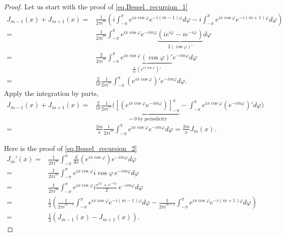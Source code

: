 \begin{proof} Let us start with the proof of \eqref{eq.Bessel_recursion_1}
\begin{equation}\label{eq.proof_Bessel_recursion_1}
\begin{split}
    J_{m-1}(x) + J_{m+1}(x) =& \frac{1}{2\pi i^m} \left(i\int_{-\pi}^{\pi} e^{ix \cos \varphi} e^{-i(m-1) \varphi} d\varphi - i\int_{-\pi}^{\pi} e^{ix \cos \varphi} e^{-i(m+1) \varphi} d\varphi\right)
    \\
    =& \frac{1}{2\pi i^m} \int_{-\pi}^{\pi} e^{ix \cos \varphi} e^{-im \varphi} \underbrace{\left(ie^{i \varphi} - ie^{-i \varphi}\right)}_{2(\cos \varphi)'}d\varphi
    \\
    =& \frac{2}{2\pi i^m} \int_{-\pi}^{\pi} \underbrace{e^{ix \cos \varphi}(\cos \varphi)'}_{\frac{1}{ix}\left(e^{ix \cos \varphi}\right)'} e^{-im \varphi} d\varphi
    \\
    =& \frac{2}{ix}\frac{1}{2\pi i^m} \int_{-\pi}^{\pi} \left(e^{ix \cos \varphi}\right)' e^{-im \varphi} d\varphi.
\end{split}
\end{equation}
Apply the integration by parts,
\begin{equation}\label{eq.proof_Bessel_recursion_2}
\begin{split}
    J_{m-1}(x) + J_{m+1}(x) =& \frac{2}{ix}\frac{1}{2\pi i^m}\bigg(\underbrace{\left[\left(e^{ix \cos \varphi} e^{-im \varphi} \right)\right]_{-\pi}^{\pi}}_{= 0\ \textrm{by periodicity}} - \int_{-\pi}^{\pi} e^{ix \cos \varphi} \left(e^{-im \varphi}\right)' d\varphi \bigg)
    \\
    =& \frac{2m}{x}\frac{1}{2\pi i^m} \int_{-\pi}^{\pi} e^{ix \cos \varphi} e^{-im \varphi} d\varphi = \frac{2m}{x}J_m(x).
\end{split}
\end{equation}

Here is the proof of \eqref{eq.Bessel_recursion_2}
\begin{equation}\label{eq.proof_Bessel_recursion_3}
\begin{split}
    J_m'(x) =& \frac{1}{2\pi i^m} \int_{-\pi}^{\pi} \frac{d}{dx} \left( e^{ix \cos \varphi} \right) e^{-im \varphi} d\varphi
    \\
    =& \frac{1}{2\pi i^m} \int_{-\pi}^{\pi} e^{ix \cos \varphi} i\cos \varphi \, e^{-im \varphi} d\varphi
    \\
    =& \frac{1}{2\pi i^m} \int_{-\pi}^{\pi} e^{ix \cos \varphi} i\frac{e^{i\varphi} + e^{-i\varphi}}{2} \, e^{-im \varphi} d\varphi
    \\
    =& \frac{1}{2} \left( \frac{1}{2\pi i^{m-1}} \int_{-\pi}^{\pi} e^{ix \cos \varphi} e^{-i(m-1)\varphi} d\varphi - \frac{1}{2\pi i^{m+1}} \int_{-\pi}^{\pi} e^{ix \cos \varphi} e^{-i(m+1)\varphi} d\varphi \right)
    \\
    =& \frac{1}{2} (J_{m-1}(x) - J_{m+1}(x)).
\end{split}
\end{equation}


\end{proof}
